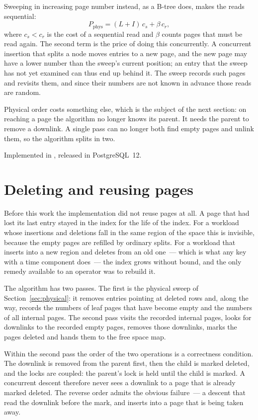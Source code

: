 Sweeping in increasing page number instead, as a B-tree does, makes the reads
sequential:
%
\begin{equation}\label{eq:vac-phys}
  P_{\mathrm{phys}} = (L + I)\,c_s + \beta\,c_r ,
\end{equation}
%
where $c_s < c_r$ is the cost of a sequential read and $\beta$ counts pages that
must be read again. The second term is the price of doing this concurrently. A
concurrent insertion that splits a node moves entries to a new page, and the new
page may have a lower number than the sweep's current position; an entry that
the sweep has not yet examined can thus end up behind it. The sweep records such
pages and revisits them, and since their numbers are not known in advance those
reads are random.

Physical order costs something else, which is the subject of the next section:
on reaching a page the algorithm no longer knows its parent. It needs the parent
to remove a downlink. A single pass can no longer both find empty pages and
unlink them, so the algorithm splits in two.

Implemented in , released in PostgreSQL~12.

\section{Deleting and reusing pages}
\label{sec:deletion}

Before this work the implementation did not reuse pages at all. A page that had
lost its last entry stayed in the index for the life of the index. For a
workload whose insertions and deletions fall in the same region of the space
this is invisible, because the empty pages are refilled by ordinary splits. For
a workload that inserts into a new region and deletes from an old one~--- which
is what any key with a time component does~--- the index grows without bound,
and the only remedy available to an operator was to rebuild it.

The algorithm has two passes. The first is the physical sweep of
Section~\ref{sec:physical}: it removes entries pointing at deleted rows and,
along the way, records the numbers of leaf pages that have become empty and the
numbers of all internal pages. The second pass visits the recorded internal
pages, looks for downlinks to the recorded empty pages, removes those downlinks,
marks the pages deleted and hands them to the free space map.

Within the second pass the order of the two operations is a correctness
condition. The downlink is removed from the parent first, then the child is
marked deleted, and the locks are coupled: the parent's lock is held until the
child is marked. A concurrent descent therefore never sees a downlink to a page
that is already marked deleted. The reverse order admits the obvious failure~---
a descent that read the downlink before the mark, and inserts into a page that
is being taken away.

